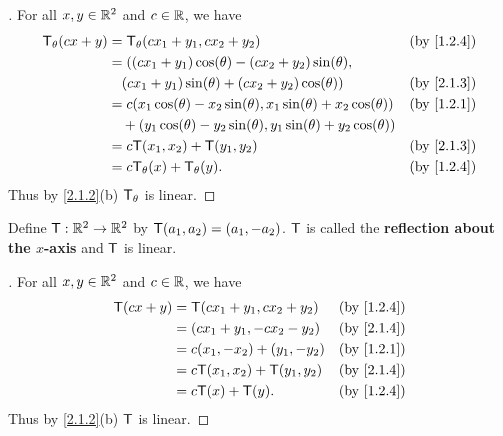 \begin{proof}[]
  For all \(x, y \in \mathbb{R}^2\) and \(c \in \mathbb{R}\), we have
  \begin{align*}
    \T_{\theta}(cx + y) & = \T_{\theta}(cx_1 + y_1, cx_2 + y_2)                                              &  & \text{(by \cref{1.2.4})} \\
                        & = ((cx_1 + y_1) \cos(\theta) - (cx_2 + y_2)\sin(\theta),                                                         \\
                        & \quad (cx_1 + y_1) \sin(\theta) + (cx_2 + y_2) \cos(\theta))                       &  & \text{(by \cref{2.1.3})} \\
                        & = c (x_1 \cos(\theta) - x_2 \sin(\theta), x_1 \sin(\theta) + x_2 \cos(\theta))     &  & \text{(by \cref{1.2.1})} \\
                        & \quad + (y_1 \cos(\theta) - y_2 \sin(\theta), y_1 \sin(\theta) + y_2 \cos(\theta))                               \\
                        & = c\T(x_1, x_2) + \T(y_1, y_2)                                                     &  & \text{(by \cref{2.1.3})} \\
                        & = c\T_{\theta}(x) + \T_{\theta}(y).                                                &  & \text{(by \cref{1.2.4})}
  \end{align*}
  Thus by \cref{2.1.2}(b) \(\mathsf{T}_{\theta}\) is linear.
\end{proof}

\begin{eg}\label{2.1.4}
  Define \(\mathsf{T} : \mathbb{R}^2 \to \mathbb{R}^2\) by \(\mathsf{T}(a_1, a_2) = (a_1, -a_2)\).
  \(\mathsf{T}\) is called the \textbf{reflection about the \(x\)-axis} and \(\mathsf{T}\) is linear.
\end{eg}

\begin{proof}[]
  For all \(x, y \in \mathbb{R}^2\) and \(c \in \mathbb{R}\), we have
  \begin{align*}
    \T(cx + y) & = \T(cx_1 + y_1, cx_2 + y_2)   &  & \text{(by \cref{1.2.4})} \\
               & = (cx_1 + y_1, -cx_2 - y_2)    &  & \text{(by \cref{2.1.4})} \\
               & = c(x_1, -x_2) + (y_1, -y_2)   &  & \text{(by \cref{1.2.1})} \\
               & = c\T(x_1, x_2) + \T(y_1, y_2) &  & \text{(by \cref{2.1.4})} \\
               & = c\T(x) + \T(y).              &  & \text{(by \cref{1.2.4})}
  \end{align*}
  Thus by \cref{2.1.2}(b) \(\mathsf{T}\) is linear.
\end{proof}

